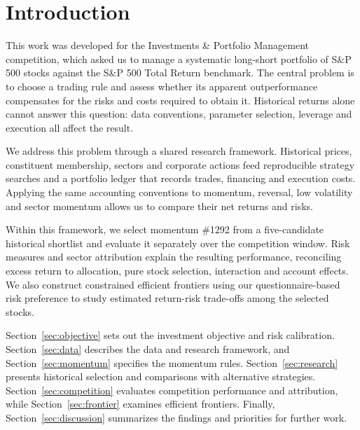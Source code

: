 \section{Introduction}
\label{sec:introduction}

This work was developed for the Investments \& Portfolio Management
competition, which asked us to manage a systematic long-short portfolio of
S\&P 500 stocks against the S\&P 500 Total Return benchmark. The central problem
is to choose a trading rule and assess whether its apparent outperformance
compensates for the risks and costs required to obtain it. Historical returns
alone cannot answer this question: data conventions, parameter selection,
leverage and execution all affect the result.

We address this problem through a shared research framework. Historical
prices, constituent membership, sectors and corporate actions feed
reproducible strategy searches and a portfolio ledger that records trades,
financing and execution costs. Applying the same accounting conventions to
momentum, reversal, low volatility and sector momentum allows us to compare
their net returns and risks.

Within this framework, we select momentum \#1292 from a five-candidate
historical shortlist and evaluate it separately over the competition window.
Risk measures and sector attribution explain the resulting performance,
reconciling excess return to allocation, pure stock selection, interaction and
account effects.
We also construct constrained efficient frontiers using our questionnaire-based
risk preference to study estimated return-risk trade-offs among the selected
stocks.

Section~\ref{sec:objective} sets out the investment objective and risk
calibration. Section~\ref{sec:data} describes the data and research framework,
and Section~\ref{sec:momentum} specifies the momentum rules.
Section~\ref{sec:research} presents historical selection and comparisons with
alternative strategies. Section~\ref{sec:competition} evaluates competition
performance and attribution, while Section~\ref{sec:frontier} examines efficient
frontiers. Finally, Section~\ref{sec:discussion} summarizes the findings and
priorities for further work.
